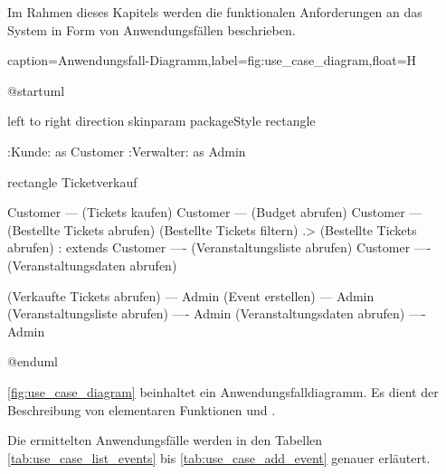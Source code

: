 Im Rahmen dieses Kapitels werden die funktionalen Anforderungen an das System in Form von Anwendungsfällen beschrieben. 

\begin{dhbwfigure}{caption=Anwendungsfall-Diagramm,label=fig:use_case_diagram,float=H}
    \begin{plantuml}
        @startuml

            left to right direction
            skinparam packageStyle rectangle

            :Kunde: as Customer
            :Verwalter: as Admin

            rectangle Ticketverkauf {
                Customer --- (Tickets kaufen)
                Customer --- (Budget abrufen)
                Customer --- (Bestellte Tickets abrufen)
                (Bestellte Tickets filtern) .> (Bestellte Tickets abrufen) : extends
                Customer ---- (Veranstaltungsliste abrufen)
                Customer ---- (Veranstaltungsdaten abrufen)

                (Verkaufte Tickets abrufen) --- Admin
                (Event erstellen) --- Admin
                (Veranstaltungsliste abrufen) ---- Admin
                (Veranstaltungsdaten abrufen) ---- Admin
            }
        @enduml
    \end{plantuml}
\end{dhbwfigure}

\autoref{fig:use_case_diagram} beinhaltet ein Anwendungsfalldiagramm.
Es dient der Beschreibung von elementaren Funktionen und .

Die ermittelten Anwendungsfälle werden in den Tabellen \ref{tab:use_case_list_events} bis \ref{tab:use_case_add_event} genauer erläutert. %


